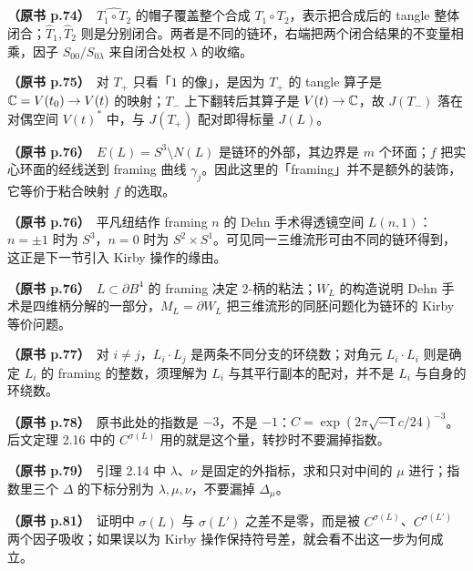 \noindent \textbf{（原书 p.74）}\ $\widehat{T_1\circ T_2}$ 的帽子覆盖整个合成 $T_1\circ T_2$，表示把合成后的 tangle 整体闭合；$\hat T_1,\hat T_2$ 则是分别闭合。两者是不同的链环，右端把两个闭合结果的不变量相乘，因子 $S_{00}/S_{0\lambda}$ 来自闭合处权 $\lambda$ 的收缩。\par\smallskip

\noindent \textbf{（原书 p.75）}\ 对 $T_+$ 只看「$1$ 的像」，是因为 $T_+$ 的 tangle 算子是 $\mathbb{C}=V(t_0)\to V(t)$ 的映射；$T_-$ 上下翻转后其算子是 $V(t)\to\mathbb{C}$，故 $J(T_-)$ 落在对偶空间 $V(t)^\ast$ 中，与 $J(T_+)$ 配对即得标量 $J(L)$。\par\smallskip

\noindent \textbf{（原书 p.76）}\ $E(L)=S^3\setminus N(L)$ 是链环的外部，其边界是 $m$ 个环面；$f$ 把实心环面的经线送到 framing 曲线 $\gamma_j$。因此这里的「framing」并不是额外的装饰，它等价于粘合映射 $f$ 的选取。\par\smallskip

\noindent \textbf{（原书 p.76）}\ 平凡纽结作 framing $n$ 的 Dehn 手术得透镜空间 $L(n,1)$：$n=\pm1$ 时为 $S^3$，$n=0$ 时为 $S^2\times S^1$。可见同一三维流形可由不同的链环得到，这正是下一节引入 Kirby 操作的缘由。\par\smallskip

\noindent \textbf{（原书 p.76）}\ $L\subset\partial B^4$ 的 framing 决定 $2$-柄的粘法；$W_L$ 的构造说明 Dehn 手术是四维柄分解的一部分，$M_L=\partial W_L$ 把三维流形的同胚问题化为链环的 Kirby 等价问题。\par\smallskip

\noindent \textbf{（原书 p.77）}\ 对 $i\ne j$，$L_i\cdot L_j$ 是两条不同分支的环绕数；对角元 $L_i\cdot L_i$ 则是确定 $L_i$ 的 framing 的整数，须理解为 $L_i$ 与其平行副本的配对，并不是 $L_i$ 与自身的环绕数。\par\smallskip

\noindent \textbf{（原书 p.78）}\ 原书此处的指数是 $-3$，不是 $-1$：$C=\exp(2\pi\sqrt{-1}c/24)^{-3}$。后文定理 2.16 中的 $C^{\sigma(L)}$ 用的就是这个量，转抄时不要漏掉指数。\par\smallskip

\noindent \textbf{（原书 p.79）}\ 引理 2.14 中 $\lambda$、$\nu$ 是固定的外指标，求和只对中间的 $\mu$ 进行；指数里三个 $\Delta$ 的下标分别为 $\lambda,\mu,\nu$，不要漏掉 $\Delta_\mu$。\par\smallskip

\noindent \textbf{（原书 p.81）}\ 证明中 $\sigma(L)$ 与 $\sigma(L')$ 之差不是零，而是被 $C^{\sigma(L)}$、$C^{\sigma(L')}$ 两个因子吸收；如果误以为 Kirby 操作保持符号差，就会看不出这一步为何成立。\par\smallskip

